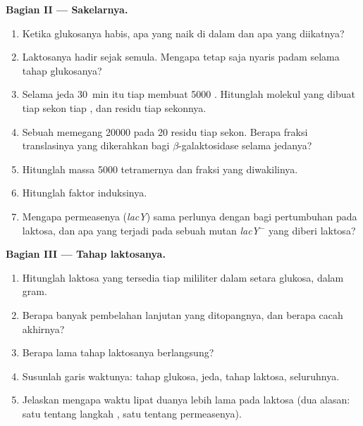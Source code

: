 \begin{problem}
\medskip
\noindent\textbf{Bagian II --- Sakelarnya.}
\begin{enumerate}[resume]
  \item Ketika glukosanya habis, apa yang naik di dalam  dan apa
        yang diikatnya?
  \item Laktosanya hadir sejak semula. Mengapa  tetap saja
        nyaris padam selama tahap glukosanya?
  \item Selama jeda \qty{30}{min} itu tiap  membuat \num{5000}
        . Hitunglah molekul  yang dibuat tiap sekon tiap
        , dan residu tiap sekonnya.
  \item Sebuah  memegang \num{20000}  pada \qty{20}{} residu
        tiap sekon. Berapa fraksi translasinya yang dikerahkan bagi
        $\beta$-galaktosidase selama jedanya?
  \item Hitunglah massa \num{5000} tetramernya dan fraksi 
         yang diwakilinya.
  \item Hitunglah faktor induksinya.
  \item Mengapa permeasenya (\emph{lacY}) sama perlunya dengan 
        bagi pertumbuhan pada laktosa, dan apa yang terjadi pada sebuah
        mutan \emph{lacY}$^-$ yang diberi laktosa?
\end{enumerate}

\medskip
\noindent\textbf{Bagian III --- Tahap laktosanya.}
\begin{enumerate}[resume]
  \item Hitunglah laktosa yang tersedia tiap mililiter dalam setara
        glukosa, dalam gram.
  \item Berapa banyak pembelahan lanjutan yang ditopangnya, dan berapa
        cacah  akhirnya?
  \item Berapa lama tahap laktosanya berlangsung?
  \item Susunlah garis waktunya: tahap glukosa, jeda, tahap laktosa,
        seluruhnya.
  \item Jelaskan mengapa waktu lipat duanya lebih lama pada laktosa
        (dua alasan: satu tentang langkah , satu tentang
        permeasenya).
\end{enumerate}


\end{problem}
